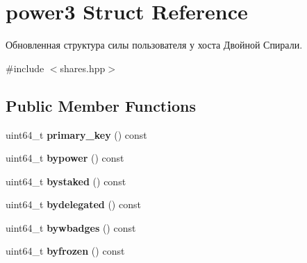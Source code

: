 \hypertarget{structpower3}{}\section{power3 Struct Reference}
\label{structpower3}


Обновленная структура силы пользователя у хоста Двойной Спирали.  




{\ttfamily \#include $<$shares.\+hpp$>$}

\subsection*{Public Member Functions}
\begin{DoxyCompactItemize}
\item 
\mbox{\label{structpower3_aa06e6c5f25d11e5a76d18ee51ab464fd}} 
uint64\+\_\+t {\bfseries primary\+\_\+key} () const
\item 
\mbox{\label{structpower3_a00fc4fcf68fcccd63bab250ba3064874}} 
uint64\+\_\+t {\bfseries bypower} () const
\item 
\mbox{\label{structpower3_a323807599f888d02878526568232990e}} 
uint64\+\_\+t {\bfseries bystaked} () const
\item 
\mbox{\label{structpower3_a2ba9d33f4c24813e3888cf8d91049ade}} 
uint64\+\_\+t {\bfseries bydelegated} () const
\item 
\mbox{\label{structpower3_a708ed95e50528c284fb8beb1679102ce}} 
uint64\+\_\+t {\bfseries bywbadges} () const
\item 
\mbox{\label{structpower3_a68c582634031ca9a7b9a6cd3a8f10405}} 
uint64\+\_\+t {\bfseries byfrozen} () const
\end{DoxyCompactItemize}
